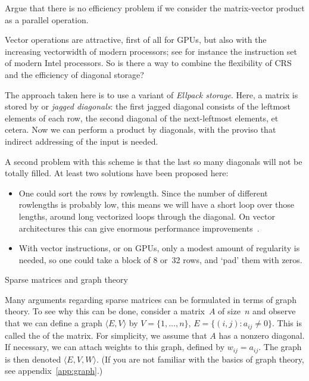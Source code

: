 \begin{exercise}
  Argue that there is no efficiency problem
  if we consider the matrix-vector product as a parallel operation.
\end{exercise}

Vector operations are attractive, first of all for \acp{GPU},
but also with the increasing vectorwidth of modern processors;
see for instance the  instruction set of
modern Intel processors.
So is there a way to combine the flexibility of \ac{CRS} and
the efficiency of diagonal storage?

The approach taken here is to use a variant of 
\emph{Ellpack storage}.
Here, a matrix is stored by or
\emph{jagged diagonals}:
the first jagged diagonal consists of the leftmost elements of each row,
the second diagonal of the next-leftmost elements, et cetera.
Now we can perform a product by diagonals,
with the proviso that indirect addressing of the input is needed.

A second problem with this scheme is that the last so many diagonals
will not be totally filled. At least two solutions have been proposed here:
\begin{itemize}
\item One could sort the rows by rowlength. Since the number of different
  rowlengths is probably low, this means we will have a short loop over those lengths,
  around long vectorized loops through the diagonal. On vector architectures
  this can give enormous performance improvements~\cite{DAzevedo2005:vector-mvp}.
\item With vector instructions, or on \acp{GPU}, only a modest amount of regularity
  is needed, so one could take a block of 8 or~32 rows, and `pad' them with zeros.
\end{itemize}


 {Sparse matrices and graph theory}
\label{sec:sparse-graph}

Many arguments regarding sparse matrices can be formulated in terms of
graph theory.  To see why this can be done,
consider a matrix~$A$ of size~$n$ and observe that we can
define a graph $\langle E,V\rangle$ by $V=\{1,\ldots,n\}$, $E=\{(i,j)\colon
a_{ij}\not=0\}$. This is called the  of the
matrix. For simplicity, we assume that $A$ has a nonzero
diagonal. 
If
necessary, we can attach weights to this graph, defined by
$w_{ij}=a_{ij}$. The graph is then denoted $\langle E,V,W\rangle$.
(If you are not familiar with the basics of graph
theory, see appendix~\ref{app:graph}.)

